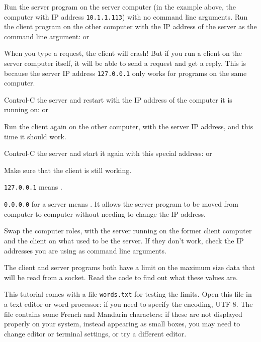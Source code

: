 \STEP Run the server program on the server computer (in the example above, the computer
with IP address \texttt{10.1.1.113}) with no command line arguments.
Run the client program on the other computer with the IP address of the server
as the command line argument:
or

When you type a request, the client will crash! But if you run a client on the server computer
itself, it will be able to send a request and get a reply. This is because the server IP address
\texttt{127.0.0.1} only works for programs on the same computer.

\STEP Control-C the server and restart with the IP address of the computer it is running on:
or

Run the client again on the other computer, with the server IP address, and this time
it should work.

\STEP Control-C the server and start it again with this special address:
or

Make sure that the client is still working.

\begin{IMPORTANT}
\texttt{127.0.0.1} means .

\texttt{0.0.0.0} for a server means . It allows
the server program to be moved from computer to computer without needing to change the
IP address.
\end{IMPORTANT}

\STEP Swap the computer roles, with the server running on the former client computer and
the client on what used to be the server. If they don't work, check the IP addresses
you are using as command line arguments.



The client and server programs both have a limit on the maximum size data that
will be read from a socket. Read the code to find out what these values are.

This tutorial comes with a file \texttt{words.txt} for testing the limits. Open this
file in a text editor or word processor: if you need to specify the encoding, UTF-8.
The file contains some French and Mandarin characters: if these are not displayed
properly on your system, instead appearing as small boxes, you may need to change
editor or terminal settings, or try a different editor.

